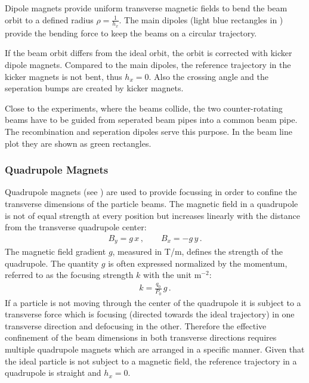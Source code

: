 Dipole magnets provide uniform transverse magnetic fields to bend the beam orbit to a defined radius $\rho = \frac{1}{h_x}$. The main dipoles (light blue rectangles in ) provide the bending force to keep the beams on a circular trajectory. 

If the beam orbit differs from the ideal orbit, the orbit is corrected with kicker dipole magnets. Compared to the main dipoles, the reference trajectory in the kicker magnets is not bent, thus $h_x=0$. Also the crossing angle and the seperation bumps are created by kicker magnets.  

Close to the experiments, where the beams collide, the two counter-rotating beams have to be guided from seperated beam pipes into a common beam pipe. The recombination and seperation dipoles serve this purpose. In the beam line plot they are shown as green rectangles.

\subsubsection{Quadrupole Magnets}

Quadrupole magnets (see ) are used to provide focussing in order to confine the transverse dimensions of the particle beams. The magnetic field in a quadrupole is not of equal strength at every position but increases linearly with the distance from the transverse quadrupole center:
\begin{align}
B_y = g \, x \, , \quad \quad B_x = - g \, y \, .
\end{align}
The magnetic field gradient $g$, measured in T/m, defines the strength of the quadrupole. The quantity $g$ is often expressed normalized by the momentum, referred to as the focusing strength $k$ with the unit m$^{-2}$:
%
\begin{align}
  k = \frac{q_0}{P_0} \, g \, .
\end{align}
%
If a particle is not moving through the center of the quadrupole it is subject to a transverse force which is focusing (directed towards the ideal trajectory) in one transverse direction and defocusing in the other. Therefore the effective confinement of the beam dimensions in both transverse directions requires multiple quadrupole magnets which are arranged in a specific manner. Given that the ideal particle is not subject to a magnetic field, the reference trajectory in a quadrupole is straight and $h_x=0$. 


